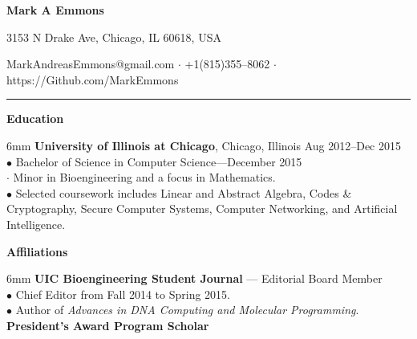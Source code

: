 \documentclass[11pt]{article}
\newcommand{\sectionheader}[1]{\noindent \textbf{\large #1}}
\newenvironment{sectionbody}{\begin{adjustwidth}{6mm}{}}{\end{adjustwidth}}
\begin{document}

\centerline{\LARGE \bf Mark A Emmons}
\centerline{3153 N Drake Ave, Chicago, IL 60618, USA}
\centerline{MarkAndreasEmmons@gmail.com $\cdot$ +1(815)355--8062 $\cdot$ https://Github.com/MarkEmmons}

\noindent\rule{16.5cm}{0.4pt}

\sectionheader{Education}
\begin{sectionbody}
{\bf University of Illinois at Chicago}, Chicago, Illinois \hfill Aug 2012--Dec 2015 \\
$\bullet$ Bachelor of Science in Computer Science---December 2015 \\
\indent $\cdot$ Minor in Bioengineering and a focus in Mathematics. \\
$\bullet$ Selected coursework includes Linear and Abstract Algebra, Codes \& Cryptography, Secure Computer Systems, Computer Networking, and Artificial Intelligence.
\end{sectionbody}

\vspace{2mm}

\sectionheader{Affiliations}
\begin{sectionbody}
{\bf UIC Bioengineering Student Journal} --- Editorial Board Member \\
$\bullet$ Chief Editor from Fall 2014 to Spring 2015. \\
$\bullet$ Author of {\it Advances in DNA Computing and Molecular Programming}. \\
{\bf President's Award Program Scholar}
\end{sectionbody}

%

\vspace{2mm}
\end{document}
